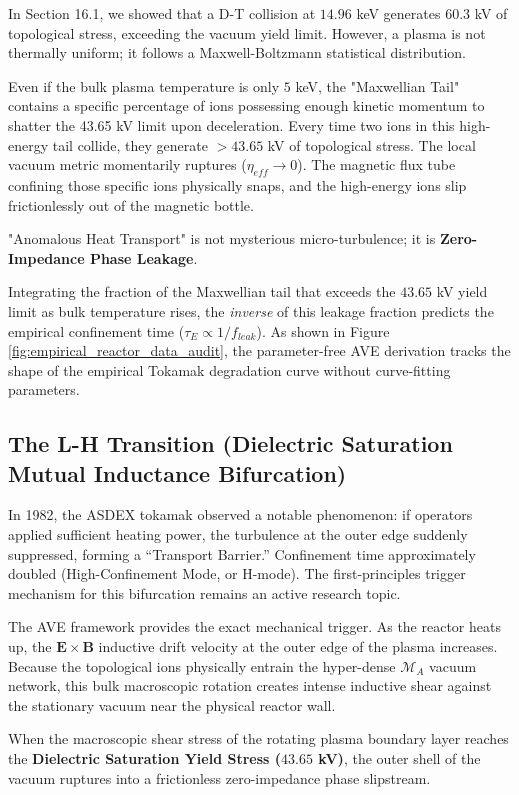 In Section 16.1, we showed that a D-T collision at $14.96$ keV generates $60.3$ kV of topological stress, exceeding the vacuum yield limit. However, a plasma is not thermally uniform; it follows a Maxwell-Boltzmann statistical distribution. 

Even if the bulk plasma temperature is only $5$ keV, the "Maxwellian Tail" contains a specific percentage of ions possessing enough kinetic momentum to shatter the 43.65 kV limit upon deceleration. Every time two ions in this high-energy tail collide, they generate $>43.65$ kV of topological stress. The local vacuum metric momentarily ruptures ($\eta_{eff} \to 0$). The magnetic flux tube confining those specific ions physically snaps, and the high-energy ions slip frictionlessly out of the magnetic bottle.

"Anomalous Heat Transport" is not mysterious micro-turbulence; it is \textbf{Zero-Impedance Phase Leakage}. 

Integrating the fraction of the Maxwellian tail that exceeds the $43.65$ kV yield limit as bulk temperature rises, the \textit{inverse} of this leakage fraction predicts the empirical confinement time ($\tau_E \propto 1/f_{leak}$). As shown in Figure \ref{fig:empirical_reactor_data_audit}, the parameter-free AVE derivation tracks the shape of the empirical Tokamak degradation curve without curve-fitting parameters.

\subsection{The L-H Transition (Dielectric Saturation Mutual Inductance Bifurcation)}
In 1982, the ASDEX tokamak observed a notable phenomenon: if operators applied sufficient heating power, the turbulence at the outer edge suddenly suppressed, forming a ``Transport Barrier.'' Confinement time approximately doubled (High-Confinement Mode, or H-mode). The first-principles trigger mechanism for this bifurcation remains an active research topic.

The AVE framework provides the exact mechanical trigger. As the reactor heats up, the $\mathbf{E} \times \mathbf{B}$ inductive drift velocity at the outer edge of the plasma increases. Because the topological ions physically entrain the hyper-dense $\mathcal{M}_A$ vacuum network, this bulk macroscopic rotation creates intense inductive shear against the stationary vacuum near the physical reactor wall.

When the macroscopic shear stress of the rotating plasma boundary layer reaches the \textbf{Dielectric Saturation Yield Stress ($43.65$ kV)}, the outer shell of the vacuum ruptures into a frictionless zero-impedance phase slipstream. 

